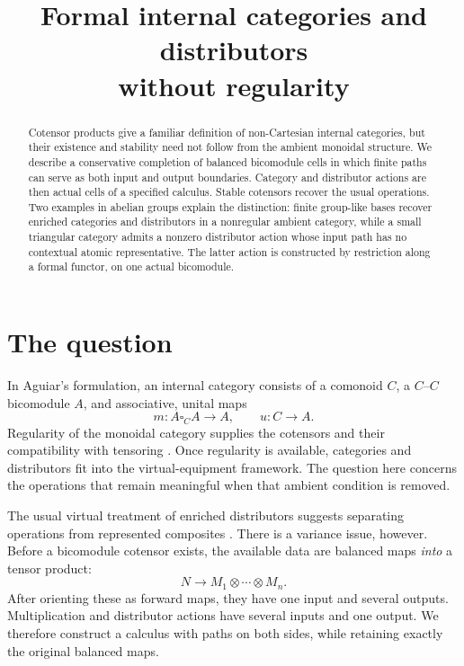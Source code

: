\documentclass[11pt,a4paper]{article}
\title{Formal internal categories and distributors\\without regularity}
\author{}
\date{}
\theoremstyle{definition}
\theoremstyle{remark}
\numberwithin{equation}{section}
\begin{document}
\maketitle
\vspace{-1.6em}
\begin{abstract}
Cotensor products give a familiar definition of non-Cartesian internal
categories, but their existence and stability need not follow from the
ambient monoidal structure. We describe a conservative completion of
balanced bicomodule cells in which finite paths can serve as both input
and output boundaries. Category and distributor actions are then actual
cells of a specified calculus. Stable cotensors recover the usual
operations. Two examples in abelian groups explain the distinction:
finite group-like bases recover enriched categories and distributors in a
nonregular ambient category, while a small triangular category admits a
nonzero distributor action whose input path has no contextual atomic
representative. The latter action is constructed by restriction along a
formal functor, on one actual bicomodule.
\end{abstract}

\section{The question}

In Aguiar's formulation, an internal category consists of a comonoid $C$,
a $C$--$C$ bicomodule $A$, and associative, unital maps
\[
m:A\square_C A\longrightarrow A,\qquad u:C\longrightarrow A.
\]
Regularity of the monoidal category supplies the cotensors and their
compatibility with tensoring \cite{Aguiar}. Once regularity is available,
categories and distributors fit into the virtual-equipment framework.
The question here concerns the operations that remain meaningful when
that ambient condition is removed.

The usual virtual treatment of enriched distributors suggests separating
operations from represented composites \cite{CS}. There is a variance
issue, however. Before a bicomodule cotensor exists, the available data
are balanced maps \emph{into} a tensor product:
\[
N\longrightarrow M_1\otimes\cdots\otimes M_n.
\]
After orienting these as forward maps, they have one input and several
outputs. Multiplication and distributor actions have several inputs and
one output. We therefore construct a calculus with paths on both sides,
while retaining exactly the original balanced maps.
\end{document}
